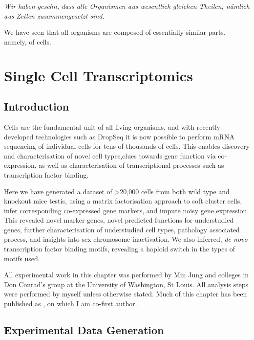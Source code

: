 \begin{savequote}[8cm]
	\textit{Wir haben gesehn, dass alle Organismen aus wesentlich gleichen Theilen, nämlich aus Zellen zusammengesetzt sind.}
	
	We have seen that all organisms are composed of essentially similar parts, namely, of cells.
\end{savequote}

\chapter{\label{ch:2-SDA} Single Cell Transcriptomics}

\minitoc

\section{Introduction}
Cells are the fundamental unit of all living organisms, and with recently developed technologies such as DropSeq it is now possible to perform mRNA sequencing of individual cells for tens of thousands of cells.
This enables discovery and characterisation of novel cell types,clues towards gene function via co-expression, as well as characterisation of transcriptional processes such as transcription factor binding.

Here we have generated a dataset of >20,000 cells from both wild type and knockout mice testis, using a matrix factorisation approach to soft cluster cells, infer corresponding co-expressed gene markers, and impute noisy gene expression.
This revealed novel marker genes, novel predicted functions for understudied genes, further characterisation of understudied cell types, pathology associated process, and insights into sex chromosome inactivation.
We also inferred, \emph{de novo} transcription factor binding motifs, revealing a haploid switch in the types of motifs used.

\vspace{0.7cm}
\begin{framed}
\noindent All experimental work in this chapter was performed by Min Jung and colleges in Don Conrad's group at the University of Washington, St Louis.
All analysis steps were performed by myself unless otherwise stated.
Much of this chapter has been published as \cite{Jung2019Unified}, on which I am co-first author.
\end{framed}

\section{Experimental Data Generation}

